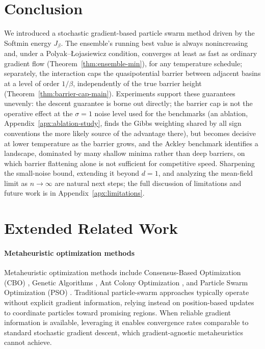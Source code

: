 \documentclass{opt2026} %
\begin{document}
\section{Conclusion}
\label{sec:conclusion}

We introduced a stochastic gradient-based particle swarm method driven by the Softmin energy $J_\beta$. The ensemble's running best value is always nonincreasing and, under a Polyak--\L{}ojasiewicz condition, converges at least as fast as ordinary gradient flow (Theorem~\ref{thm:ensemble-min}), for any temperature schedule; separately, the interaction caps the quasipotential barrier between adjacent basins at a level of order $1/\beta$, independently of the true barrier height (Theorem~\ref{thm:barrier-cap-main}). Experiments support these guarantees unevenly: the descent guarantee is borne out directly; the barrier cap is not the operative effect at the $\sigma=1$ noise level used for the benchmarks (an ablation, Appendix~\ref{apx:ablation-study}, finds the Gibbs weighting shared by all sign conventions the more likely source of the advantage there), but becomes decisive at lower temperature as the barrier grows, and the Ackley benchmark identifies a landscape, dominated by many shallow minima rather than deep barriers, on which barrier flattening alone is not sufficient for competitive speed. Sharpening the small-noise bound, extending it beyond $d=1$, and analyzing the mean-field limit as $n\to\infty$ are natural next steps; the full discussion of limitations and future work is in Appendix~\ref{apx:limitations}.



\appendix

\section{Extended Related Work}
\label{apx:related-work}

\paragraph{Metaheuristic optimization methods}
Metaheuristic optimization methods include Consensus-Based Optimization (CBO) \citep{CarrilloChoiTotzeckTse2018,fornasier2024consensus,pinnau2017consensus, carrillo2021consensus}, Genetic Algorithms \citep{Goldberg1989}, Ant Colony Optimization \citep{DorigoStutzle2004}, and Particle Swarm Optimization (PSO) \citep{kennedy1995particle, noel2012new}. Traditional particle-swarm approaches typically operate without explicit gradient information, relying instead on position-based updates to coordinate particles toward promising regions. When reliable gradient information is available, leveraging it enables convergence rates comparable to standard stochastic gradient descent, which gradient-agnostic metaheuristics cannot achieve.
\end{document}
